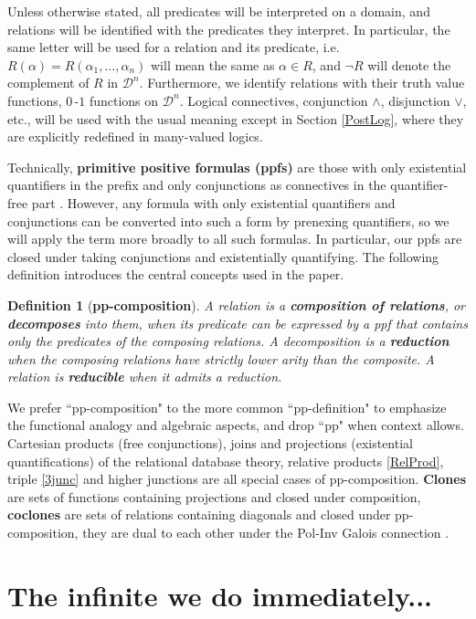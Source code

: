 \documentclass[11pt]{article}
\theoremstyle{plain}
\newtheorem{definition}{Definition}
\theoremstyle{definition}
\def\D{\mathcal{D}}
\def\a{\alpha}
\begin{document}
Unless otherwise stated, all predicates will be interpreted on a domain, and relations will be identified with the predicates they interpret. In particular, the same letter will be used for a relation and its predicate, i.e. $R(\a)=R(\a_1,\dots,\a_n)$ will mean the same as $\a\in R$, and $\neg R$ will denote the complement of $R$ in $\D^n$. Furthermore, we identify relations with  their truth value functions, $0$\,-$1$ functions on $\D^n$. Logical connectives, conjunction $\land$, disjunction $\lor$, etc., will be used with the usual meaning except in Section \ref{PostLog}, where they are explicitly redefined in many-valued logics. 

Technically, {\bf primitive positive formulas (ppfs)} are those with only existential quantifiers in the prefix and only conjunctions as connectives in the quantifier-free part \cite{CreVol08,Lag17,Rob62}. However, any formula with only existential quantifiers and conjunctions can be converted into such a form by prenexing quantifiers, so we will apply the term more broadly to all such formulas. In particular, our ppfs are closed under taking conjunctions and existentially quantifying. The following definition introduces the central concepts used in the paper.
\begin{definition}[{\bf pp-composition}]\label{ClonComp}
A relation is a {\bf composition of relations}, or {\bf decomposes} into them, when its predicate can be expressed by a ppf that contains only the predicates of the composing relations. A decomposition is a {\bf reduction} when the composing relations have strictly lower arity than the composite. A relation is {\bf reducible} when it admits a reduction. 
\end{definition}
\noindent We prefer ``pp-composition" to the more common ``pp-definition" to emphasize the functional analogy and algebraic aspects, and drop ``pp" when context allows. Cartesian products (free conjunctions), joins and projections (existential quantifications) of the relational database theory, relative products \eqref{RelProd}, triple \eqref{3junc} and higher junctions are all special cases of pp-composition. {\bf Clones} are sets of functions containing projections and closed under composition, {\bf coclones} are sets of relations containing diagonals and closed under pp-composition, they are dual to each other under the Pol-Inv Galois connection \cite{Lau,PosKal}.


\section{The infinite we do immediately...}\label{Inf}
\end{document}
